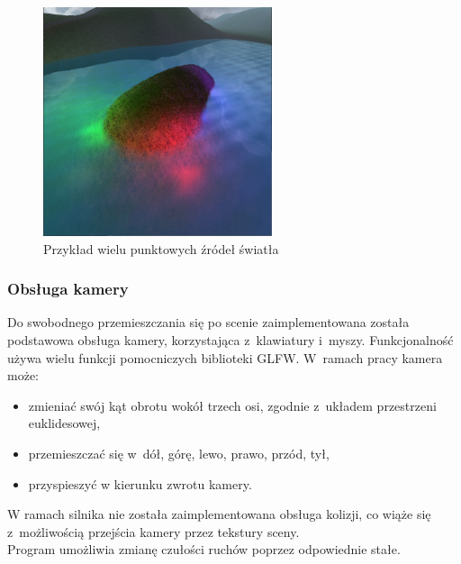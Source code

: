 \documentclass[a4paper,twoside,12pt]{book}
\begin{document}
\begin{figure}[H]
    \centering
    \includegraphics[width=0.6\textwidth]{res/multilight_example.png}
    \caption{Przykład wielu punktowych źródeł światła}
    \label{fig:multilight_example}
\end{figure}


\subsubsection{Obsługa kamery}
Do swobodnego przemieszczania się po scenie zaimplementowana została podstawowa obsługa kamery, korzystająca z~klawiatury i~myszy. Funkcjonalność używa wielu funkcji pomocniczych biblioteki GLFW. W~ramach pracy kamera może:
\begin{itemize}
    \item zmieniać swój kąt obrotu wokół trzech osi, zgodnie z~układem przestrzeni euklidesowej,
    \item przemieszczać się w~dół, górę, lewo, prawo, przód, tył,
    \item przyspieszyć w kierunku zwrotu kamery.
\end{itemize}
W ramach silnika nie została zaimplementowana obsługa kolizji, co wiąże się z~możliwością przejścia kamery przez tekstury sceny. \\
Program umożliwia zmianę czułości ruchów poprzez odpowiednie stałe.
\end{document}

